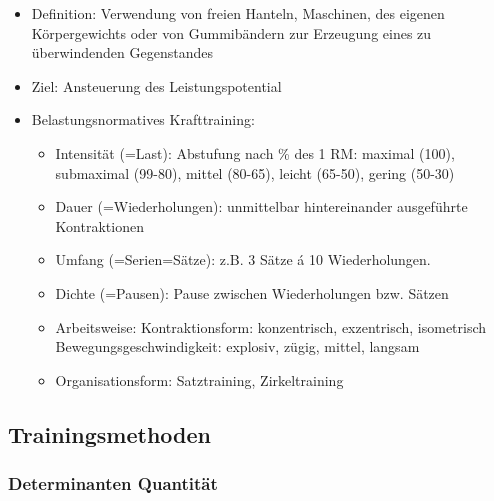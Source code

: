 \begin{itemize}
    \item Definition: Verwendung von freien Hanteln, Maschinen, des eigenen Körpergewichts oder von Gummibändern zur Erzeugung eines zu überwindenden Gegenstandes
    \item Ziel: Ansteuerung des Leistungspotential
    \item Belastungsnormatives Krafttraining:
    \begin{itemize}
        \item Intensität (=Last): Abstufung nach \% des 1 RM: maximal (100), submaximal (99-80), mittel (80-65), leicht (65-50), gering (50-30)
        \item Dauer (=Wiederholungen): unmittelbar hintereinander ausgeführte Kontraktionen
        \item Umfang (=Serien=Sätze): z.B. 3 Sätze á 10 Wiederholungen.
        \item Dichte (=Pausen): Pause zwischen Wiederholungen bzw. Sätzen
        \item Arbeitsweise: Kontraktionsform: konzentrisch, exzentrisch, isometrisch Bewegungsgeschwindigkeit: explosiv, zügig, mittel, langsam
        \item Organisationsform: Satztraining, Zirkeltraining
    \end{itemize}
\end{itemize}

\subsection{Trainingsmethoden}

\subsubsection*{Determinanten Quantität}

